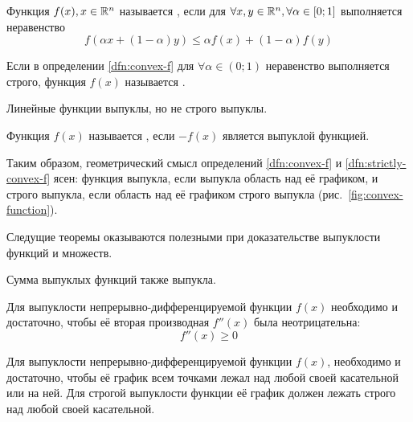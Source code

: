\begin{dfn}
  \label{dfn:convex-f}
  Функция $f(x), x \in \mathbb{R}^n$ называется , если
  для $\forall x, y \in \mathbb{R}^n, \forall \alpha \in [0;1]$
  выполняется неравенство
  \begin{equation*}
    f(\alpha x + (1-\alpha)y) \leq \alpha f(x) + (1-\alpha) f(y)
  \end{equation*}
\end{dfn}
\begin{dfn}
  \label{dfn:strictly-convex-f}
  Если в определении \ref{dfn:convex-f} для $\forall \alpha \in (0;1)$
  неравенство выполняется строго, функция $f(x)$ называется
  .
\end{dfn}
\begin{rem}
  \label{rem:lin-f-convex}
  Линейные функции выпуклы, но не строго выпуклы.
\end{rem}
\begin{dfn}
  Функция $f(x)$ называется , если $-f(x)$ является
  выпуклой функцией.
\end{dfn}

Таким образом, геометрический смысл определений \ref{dfn:convex-f} и
\ref{dfn:strictly-convex-f} ясен: функция выпукла, если выпукла
область над её графиком, и строго выпукла, если область над её
графиком строго выпукла (рис. \ref{fig:convex-function}).



Следущие теоремы оказываются полезными при доказательстве выпуклости
функций и множеств.

\begin{thm}
  \label{th:convex-f-sum}
  Сумма выпуклых функций также выпукла.
\end{thm}

\begin{thm}
  \label{th:convex-f-diff2}
  Для выпуклости непрерывно-дифференцируемой функции $f(x)$ необходимо
  и достаточно, чтобы её вторая производная $f''(x)$ была
  неотрицательна:
  \begin{equation*}
    f''(x) \geq 0
  \end{equation*}
\end{thm}

\begin{thm}
  \label{th:convex-f-tangent}
  Для выпуклости непрерывно-дифференцируемой функции $f(x)$,
  необходимо и достаточно, чтобы её график всем точками лежал над
  любой своей касательной или на ней. Для строгой выпуклости функции
  её график должен лежать строго над любой своей касательной.
\end{thm}

